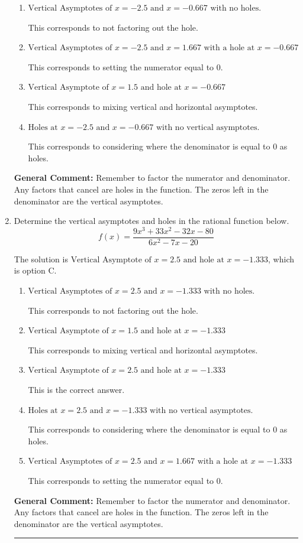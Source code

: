 \documentclass{extbook}[14pt]
\newcommand{\litem}[1]{\item #1

\rule{\textwidth}{0.4pt}}
\begin{document}
\begin{enumerate}
{\begin{enumerate}[label=\Alph*.]
This is the correct answer.
\item \( \text{Vertical Asymptotes of } x = -2.5 \text{ and } x = -0.667 \text{ with no holes.} \)

This corresponds to not factoring out the hole.
\item \( \text{Vertical Asymptotes of } x = -2.5 \text{ and } x = 1.667 \text{ with a hole at } x = -0.667 \)

This corresponds to setting the numerator equal to 0.
\item \( \text{Vertical Asymptote of } x = 1.5 \text{ and hole at } x = -0.667 \)

This corresponds to mixing vertical and horizontal asymptotes.
\item \( \text{Holes at } x = -2.5 \text{ and } x = -0.667 \text{ with no vertical asymptotes.} \)

This corresponds to considering where the denominator is equal to 0 as holes.
\end{enumerate}

\textbf{General Comment:} Remember to factor the numerator and denominator. Any factors that cancel are holes in the function. The zeros left in the denominator are the vertical asymptotes.
}
\litem{
Determine the vertical asymptotes and holes in the rational function below.
\[ f(x) = \frac{9x^{3} +33 x^{2} -32 x -80}{6x^{2} -7 x -20} \]

The solution is \( \text{Vertical Asymptote of } x = 2.5 \text{ and hole at } x = -1.333 \), which is option C.\begin{enumerate}[label=\Alph*.]
\item \( \text{Vertical Asymptotes of } x = 2.5 \text{ and } x = -1.333 \text{ with no holes.} \)

This corresponds to not factoring out the hole.
\item \( \text{Vertical Asymptote of } x = 1.5 \text{ and hole at } x = -1.333 \)

This corresponds to mixing vertical and horizontal asymptotes.
\item \( \text{Vertical Asymptote of } x = 2.5 \text{ and hole at } x = -1.333 \)

This is the correct answer.
\item \( \text{Holes at } x = 2.5 \text{ and } x = -1.333 \text{ with no vertical asymptotes.} \)

This corresponds to considering where the denominator is equal to 0 as holes.
\item \( \text{Vertical Asymptotes of } x = 2.5 \text{ and } x = 1.667 \text{ with a hole at } x = -1.333 \)

This corresponds to setting the numerator equal to 0.
\end{enumerate}

\textbf{General Comment:} Remember to factor the numerator and denominator. Any factors that cancel are holes in the function. The zeros left in the denominator are the vertical asymptotes.
}
\end{enumerate}
\end{document}
